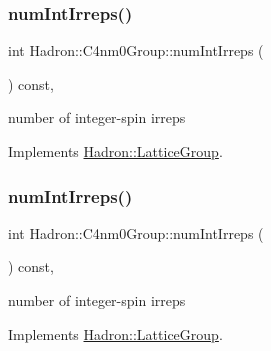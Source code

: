 \mbox{\label{structHadron_1_1C4nm0Group_aefbae18f6b66563a061d607e680fcab7}} 
\subsubsection{\texorpdfstring{numIntIrreps()}{numIntIrreps()}\hspace{0.1cm}{\footnotesize\ttfamily [2/3]}}
{\footnotesize\ttfamily int Hadron\+::\+C4nm0\+Group\+::num\+Int\+Irreps (\begin{DoxyParamCaption}{ }\end{DoxyParamCaption}) const\hspace{0.3cm}{\ttfamily [inline]}, {\ttfamily [virtual]}}

number of integer-\/spin irreps 

Implements \mbox{\hyperlink{structHadron_1_1LatticeGroup_af2aa7b39222bf188389356eefcef7547}{Hadron\+::\+Lattice\+Group}}.

\mbox{\label{structHadron_1_1C4nm0Group_aefbae18f6b66563a061d607e680fcab7}} 
\subsubsection{\texorpdfstring{numIntIrreps()}{numIntIrreps()}\hspace{0.1cm}{\footnotesize\ttfamily [3/3]}}
{\footnotesize\ttfamily int Hadron\+::\+C4nm0\+Group\+::num\+Int\+Irreps (\begin{DoxyParamCaption}{ }\end{DoxyParamCaption}) const\hspace{0.3cm}{\ttfamily [inline]}, {\ttfamily [virtual]}}

number of integer-\/spin irreps 

Implements \mbox{\hyperlink{structHadron_1_1LatticeGroup_af2aa7b39222bf188389356eefcef7547}{Hadron\+::\+Lattice\+Group}}.

\mbox{\label{structHadron_1_1C4nm0Group_ac77e1943ad8fa5f9211d31dc34ee3f6c}} 
